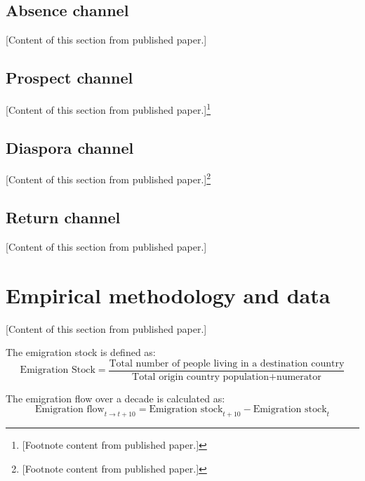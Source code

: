 \documentclass[12pt]{article}
\begin{document}
\subsection{Absence channel}
\label{sec:absence}

[Content of this section from published paper.]

\subsection{Prospect channel}
\label{sec:prospect}

[Content of this section from published paper.]\footnote{[Footnote content from published paper.]}

\subsection{Diaspora channel}
\label{sec:diaspora}

[Content of this section from published paper.]\footnote{[Footnote content from published paper.]}

\subsection{Return channel}
\label{sec:return}

[Content of this section from published paper.]

\section{Empirical methodology and data}
\label{sec:methodology}

[Content of this section from published paper.]

The emigration stock is defined as:
\begin{equation}
\text{Emigration Stock} = \frac{\text{Total number of people living in a destination country}}{\text{Total origin country population} + \text{numerator}}
\end{equation}

The emigration flow over a decade is calculated as:
\begin{equation}
\text{Emigration flow}_{t \to t+10} = \text{Emigration stock}_{t+10} - \text{Emigration stock}_{t}
\end{equation}
\end{document}
